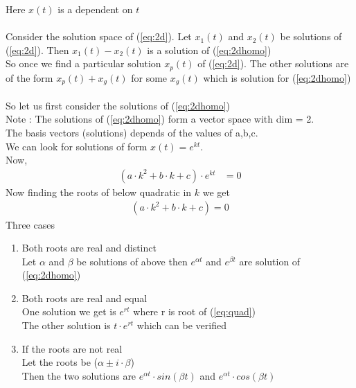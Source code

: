 \documentclass{article}
\begin{document}
\noindent Here $x(t)$ is a dependent on $t$\\\\
Consider the solution space of (\ref{eq:2d}).
Let $x_1(t)$ and $x_2(t)$ be solutions of (\ref{eq:2d}). Then $x_1(t) - x_2(t)$ is a solution of (\ref{eq:2dhomo})\\
So once we find a particular solution $x_p(t)$ of (\ref{eq:2d}). The other solutions are of the form $x_p(t) + x_g(t)$ for some $x_g(t)$ which is solution for (\ref{eq:2dhomo})\\\\
So let us first consider the solutions of (\ref{eq:2dhomo})\\
Note : The solutions of (\ref{eq:2dhomo}) form a vector space with dim = 2.\\
The basis vectors (solutions) depends of the values of a,b,c.\\
We can look for solutions of form $x(t) = e^{kt}$.\\
Now,\\
\begin{align}
    (a\cdot k^2 +b\cdot k+c)\cdot e^{kt} &= 0 \label{eq:quad}
\end{align}
Now finding the roots of below quadratic in $k$ we get\\
\begin{align*}
    (a\cdot k^2 +b\cdot k+c) = 0
\end{align*}
Three cases\\
\begin{enumerate}
    \item Both roots are real and distinct\\
    Let $\alpha$ and $\beta$ be solutions of above then $e^{\alpha t}$ and $e^{\beta t}$ are solution of (\ref{eq:2dhomo})\\
    \item Both roots are real and equal\\
    One solution we get is $e^{rt}$ where r is root of (\ref{eq:quad})\\
    The other solution is $t\cdot e^{rt}$ which can be verified\\
    \item If the roots are not real\\
    Let the roots be ($\alpha \pm i \cdot \beta$)\\
    Then the two solutions are $e^{\alpha t} \cdot sin(\beta t)$ and $e^{\alpha t} \cdot cos(\beta t)$\\
\end{enumerate}
\end{document}
